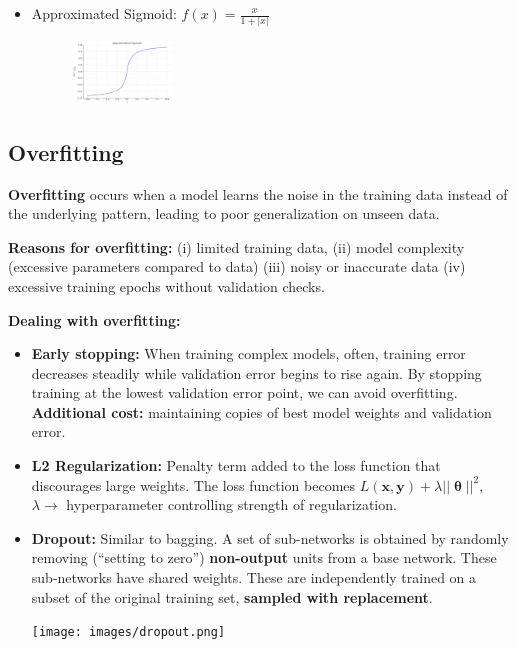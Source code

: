 \begin{itemize}
\begin{figure}[H]
      \vspace{-2em}
    \end{figure}
  \item Approximated Sigmoid: $f(x) = \frac{x}{1 + |x|}$
    \begin{figure}[H]
      \centering
      \vspace{-1em}
      \includegraphics[width=0.25\textwidth]{images/approximated_sigmoid.png}
      \vspace{-2em}
    \end{figure}
\end{itemize}

\subsection*{Overfitting}

\textbf{Overfitting} occurs when a model learns the noise in the training data instead of the underlying pattern, leading to poor generalization on unseen data.

\textbf{Reasons for overfitting:} (i) limited training data, (ii) model complexity (excessive parameters compared to data) (iii) noisy or inaccurate data (iv) excessive training epochs without validation checks.

\textbf{Dealing with overfitting:}

\begin{itemize}
  \item \textbf{Early stopping:} When training complex models, often, training error decreases steadily while validation error begins to rise again. By stopping training at the lowest validation error point, we can avoid overfitting. \textbf{Additional cost:} maintaining copies of best model weights and validation error.
  \item \textbf{L2 Regularization:} Penalty term added to the loss function that discourages large weights. The loss function becomes $L(\mathbf{x}, \mathbf{y}) + \lambda ||\boldsymbol{\uptheta}||^2$, $\lambda \rightarrow$ hyperparameter controlling strength of regularization.

  \item \textbf{Dropout:} Similar to bagging. A set of sub-networks is obtained by randomly removing (\enquote{setting to zero}) \textbf{non-output} units from a base network. These sub-networks have shared weights. These are independently trained on a subset of the original training set, \textbf{sampled with replacement}.

    \begin{minipage}{\linewidth}
    \centering
    \texttt{[image: images/dropout.png]}
  \end{minipage}
\end{itemize}

